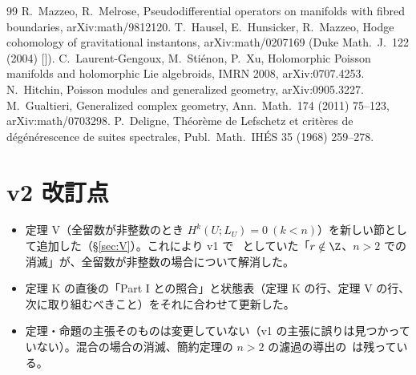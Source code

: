 \begin{thebibliography}{99}
 R.\ Mazzeo, R.\ Melrose, Pseudodifferential operators on manifolds with fibred boundaries, arXiv:math/9812120.
 T.\ Hausel, E.\ Hunsicker, R.\ Mazzeo, Hodge cohomology of gravitational instantons, arXiv:math/0207169 (Duke Math.\ J.\ 122 (2004) [\tQ]).
 C.\ Laurent-Gengoux, M.\ Sti\'enon, P.\ Xu, Holomorphic Poisson manifolds and holomorphic Lie algebroids, IMRN 2008, arXiv:0707.4253.
 N.\ Hitchin, Poisson modules and generalized geometry, arXiv:0905.3227.
 M.\ Gualtieri, Generalized complex geometry, Ann.\ Math.\ 174 (2011) 75--123, arXiv:math/0703298.
 P.\ Deligne, Th\'eor\`eme de Lefschetz et crit\`eres de d\'eg\'en\'erescence de suites spectrales, Publ.\ Math.\ IH\'ES 35 (1968) 259--278.
\end{thebibliography}

\section*{v2 改訂点}
\begin{itemize}
\item 定理 V（全留数が非整数のとき $H^k(U;L_U)=0\ (k<n)$）を新しい節として追加した（\S\ref{sec:V}）。これにより v1 で \tQ\ としていた「$r\notin\Z$、$n>2$ での消滅」が、全留数が非整数の場合について解消した。
\item 定理 K の直後の「Part I との照合」と状態表（定理 K の行、定理 V の行、次に取り組むべきこと）をそれに合わせて更新した。
\item 定理・命題の主張そのものは変更していない（v1 の主張に誤りは見つかっていない）。混合の場合の消滅、簡約定理の $n>2$ の濾過の導出の\tQ\ は残っている。
\end{itemize}
